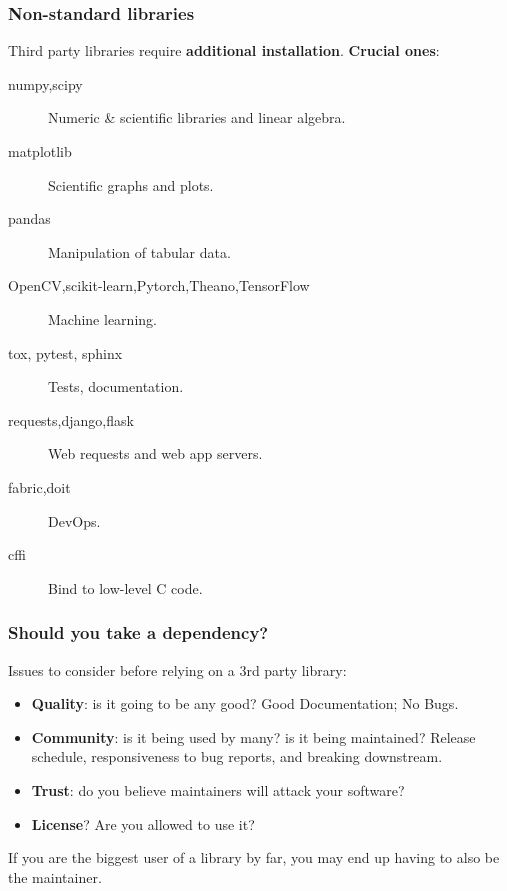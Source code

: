 \documentclass{beamer} %
\newcommand\emc[1]{\textcolor{brightblue}{\textbf{#1}}}
\begin{document}
\begin{frame}

\frametitle{Non-standard libraries}

Third party libraries require \emc{additional installation}. \emc{Crucial ones}:
\begin{description}
  \item[numpy,scipy] Numeric \& scientific libraries and linear algebra.
  \item[matplotlib] Scientific graphs and plots.
  \item[pandas] Manipulation of tabular data.
  \item[OpenCV,scikit-learn,Pytorch,Theano,TensorFlow] Machine learning.
  \item[tox, pytest, sphinx] Tests, documentation.
  \item[requests,django,flask] Web requests and web app servers.
  \item[fabric,doit] DevOps.
  \item[cffi] Bind to low-level C code.
\end{description}

\end{frame}


\begin{frame}

\frametitle{Should you take a dependency?}

Issues to consider before relying on a 3rd party library:
\begin{itemize}
\item \emc{Quality}: is it going to be any good? Good Documentation; No Bugs.
\item \emc{Community}: is it being used by many? is it being maintained? Release schedule, responsiveness to bug reports, and breaking downstream.
\item \emc{Trust}: do you believe maintainers will attack your software?
\item \emc{License}? Are you allowed to use it?
\end{itemize}

\begin{block}{}
If you are the biggest user of a library by far, you may end up having to also be the maintainer.
\end{block}

\end{frame}
\end{document}
